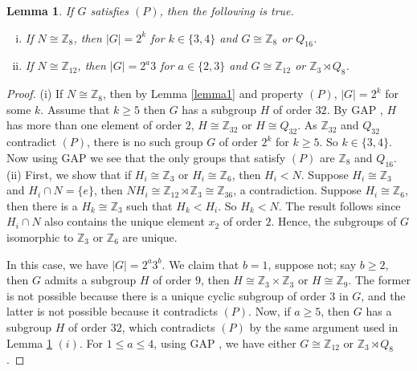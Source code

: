 \documentclass[a4paper,11pt]{amsart}
\numberwithin{equation}{section}
\numberwithin{equation}{subsection}
\newtheorem{lemma}[theorem]{Lemma}
\begin{document}
\begin{lemma}\label{Lemma2}
  If $G$ satisfies $(P)$, then the following is true.
    \begin{enumerate}[(i)]
    \item
    If $N\cong \mathbb{Z}_{8}$, then $|G|=2^{k}$ for $k\in\{3,4\}$ and $G \cong \mathbb{Z}_{8} $ or 
    $Q_{16}$.

    \item If $N\cong \mathbb{Z}_{12}$, then $|G|=2^{a}3$ for $a\in \{2,3\}$ and $G\cong \mathbb{Z}_{12}$ or $ \mathbb{Z}_{3}\rtimes Q_8$.
    \end{enumerate}

\end{lemma}
\begin{proof}
(i)    If $N\cong \mathbb{Z}_{8}$, then by Lemma \ref{lemma1} and property $(P)$, $|G|=2^{k}$ for some $k$. Assume that $k\geq 5$ then $G$ has a subgroup $H$ of order $32$. By GAP \cite{GAP},  $H$ has more than one element of order $2$, $H\cong \mathbb{Z}_{32}$ or $H\cong Q_{32}$. As $\mathbb{Z}_{32}$ and $Q_{32}$ contradict $(P)$, there is no such group $G$ of order $2^{k}$ for $k\geq 5$. So $k\in\{3,4\}$. Now using GAP \cite{GAP} we see that the only groups that satisfy $(P)$ are $\mathbb{Z}_{8}$ and $Q_{16}.$\\

(ii) First, we show that if
$H_i\cong \mathbb{Z}_3$ or $H_i\cong \mathbb{Z}_6$,
then $H_i<N$. Suppose $H_i\cong \mathbb{Z}_3$ and $H_i\cap N = \{e\}$, then $NH_i\cong \mathbb{Z}_{12}\rtimes \mathbb{Z}_3 \cong \mathbb{Z}_{36}$, a contradiction. 
    Suppose $H_i\cong \mathbb{Z}_6$, then there is a  $H_{k}\cong \mathbb{Z}_{3}$ such that $H_{k} < H_{i}$. So $H_{k} <N$.
  The result follows since $H_i\cap N$ also contains the unique element $x_2$ of order $2$. Hence, the subgroups of $G$ isomorphic to $\mathbb Z_3$ or $\mathbb Z_6$ are unique.

In this case, we have
$|G|=2^{a}3^b$. We claim that $b=1$, suppose not; say $b\geq 2$, then $G$ admits a subgroup $H$ of order $9$, then $H\cong \mathbb{Z}_{3}\times \mathbb{Z}_{3}$ or $H\cong \mathbb{Z}_{9}$. The former is not possible because there is a unique cyclic subgroup of order $3$ in $G$, and the latter is not possible because it contradicts $(P)$.
  Now, if $a\geq 5$, then $G$ has a subgroup $H$ of order $32$, which contradicts $(P)$ by the same argument used in Lemma \ref{Lemma2} $(i)$. For $1 \leq a\leq 4$, using GAP \cite{GAP}, we have either $G\cong \mathbb{Z}_{12}$ or $\mathbb{Z}_{3}\rtimes Q_8$.
  
\end{proof}
\end{document}
